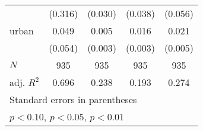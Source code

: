 {\begin{tabular}{l*{4}{c}}
            &     (0.316)         &     (0.030)         &     (0.038)         &     (0.056)         \\
[1em]
urban       &       0.049         &       0.005\sym{**} &       0.016\sym{***}&       0.021\sym{***}\\
            &     (0.054)         &     (0.003)         &     (0.003)         &     (0.005)         \\
\hline
\(N\)       &         935         &         935         &         935         &         935         \\
adj. \(R^{2}\)&       0.696         &       0.238         &       0.193         &       0.274         \\
\hline\hline
\multicolumn{5}{l}{\footnotesize Standard errors in parentheses}\\
\multicolumn{5}{l}{\footnotesize \sym{*} \(p<0.10\), \sym{**} \(p<0.05\), \sym{***} \(p<0.01\)}\\
\end{tabular}
}
